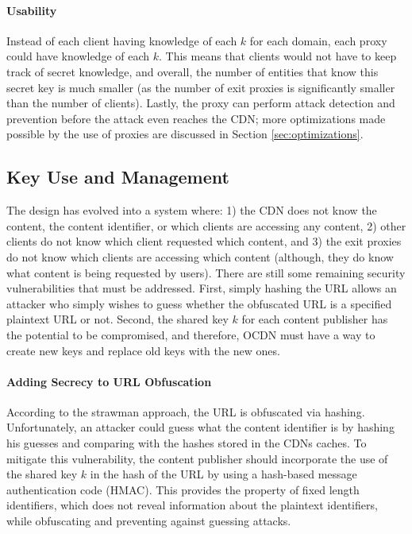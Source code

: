 \paragraph{Usability} Instead of each client having knowledge 
of each $k$ for each domain, each proxy could have knowledge of each $k$.  This means that clients would 
not have to keep track of secret knowledge, and overall, the number of entities that know this secret key 
is much smaller (as the number of exit proxies is significantly smaller than the number of clients).  Lastly, 
the proxy can perform attack detection and prevention before the attack even reaches the CDN; more optimizations 
made possible by the use of proxies are discussed in Section \ref{sec:optimizations}.

\subsection{Key Use and Management}
\label{sec:keys}
The design has evolved into a system where: 1) the CDN does not know the content, the content identifier, 
or which clients are accessing any content, 2) other clients do not know which client requested which content, and 
3) the exit proxies do not know which clients are accessing which content (although, they do know what content is
being requested by \system{} users).  There are still 
some remaining security vulnerabilities that must be addressed.  First, simply hashing the URL allows an attacker who simply 
wishes to guess whether the obfuscated URL is a specified plaintext URL or not.  Second, the shared key $k$ for each content 
publisher has the potential to be compromised, and therefore, OCDN must have a way to create new keys and replace 
old keys with the new ones.

\paragraph{Adding Secrecy to URL Obfuscation} According to the strawman approach, the URL is obfuscated via hashing.  Unfortunately, 
an attacker could guess what the content identifier is by hashing his guesses and comparing with the hashes stored in the 
CDNs caches.  To mitigate this vulnerability, the content publisher should incorporate the use of the shared key $k$ in the 
hash of the URL by using a hash-based message authentication code (HMAC).  This provides the property of fixed length 
identifiers, which does not reveal information about the plaintext identifiers, while obfuscating and preventing 
against guessing attacks.  

